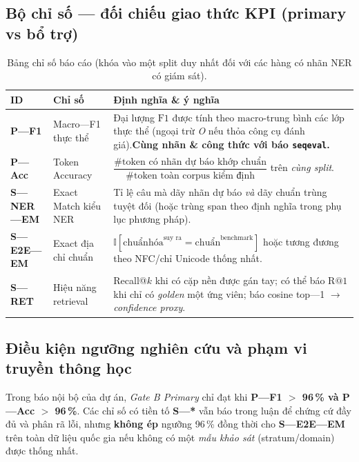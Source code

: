 \subsection{Bộ chỉ số --- đối chiếu giao thức KPI (primary vs bổ trợ)}
\begin{table}[h]
\centering
\caption{Bảng chỉ số báo cáo (khóa vào một split duy nhất đối với các hàng có nhãn NER có giám sát).}
\label{tab:metrics}
\begin{tabular}{@{}llp{6.5cm}@{}}
\toprule
\textbf{ID} & \textbf{Chỉ số} & \textbf{Định nghĩa \& ý nghĩa} \\
\midrule
\textbf{P---F1} & Macro---F1 thực thể & Đại lượng \(\mathrm{F1}\) được tính theo \(\mathrm{macro}\)-trung bình các lớp thực thể (ngoại trừ \emph{O} nếu thỏa công cụ đánh giá).\newline \textbf{Cùng nhãn \& công thức với báo \texttt{seqeval}.} \\
\textbf{P---Acc} & Token Accuracy & \(\dfrac{\#\text{token có nhãn dự báo khớp chuẩn}}{\#\text{token toàn corpus kiểm định}}\) trên \emph{cùng split}. \\
\textbf{S---NER---EM} & Exact Match kiểu NER & Tỉ lệ câu mà dãy nhãn dự báo \emph{và} dãy chuẩn trùng tuyệt đối (hoặc trùng span theo định nghĩa trong phụ lục phương pháp). \\
\textbf{S---E2E---EM} & Exact địa chỉ chuẩn & \(\mathbb{I}\!\left[\mathrm{chuẩn hóa}^{\text{suy ra}} = \mathrm{chuẩn}^{\text{benchmark}}\right]\) hoặc tương đương theo NFC/chỉ Unicode thống nhất. \\
\textbf{S---RET} & Hiệu năng retrieval & Recall@\(k\) khi có cặp nền được gán tay; có thể báo \(\mathrm{R@}1\) khi chỉ có \emph{golden} một ứng viên; báo cosine top---1 \(\rightarrow\) \emph{confidence proxy}. \\
\bottomrule
\end{tabular}
\end{table}

\subsection{Điều kiện ngưỡng nghiên cứu và phạm vi truyền thông học}
Trong báo nội bộ của dự án, \emph{Gate B Primary} chỉ đạt khi \textbf{P---F1 $>$ 96\,\% và P---Acc $>$ 96\,\%}. Các chỉ số có tiền tố \textbf{S---*} vẫn báo trong luận để chứng cứ đầy đủ và phân rã lỗi, nhưng \textbf{không ép} ngưỡng 96\,\% đồng thời cho \textbf{S---E2E---EM} trên toàn dữ liệu quốc gia nếu không có một \emph{mẫu khảo sát} (stratum/domain) được thống nhất.

